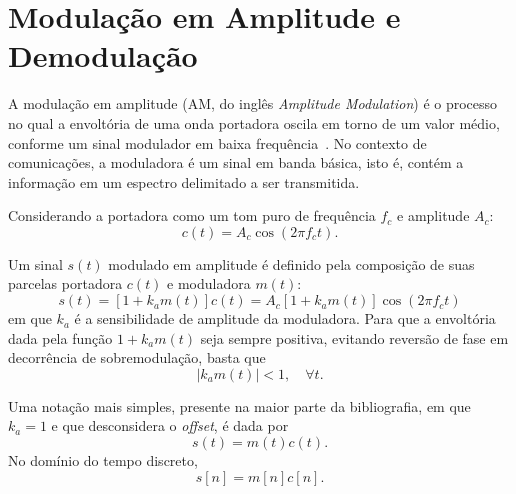\section{Modulação em Amplitude e Demodulação}
A modulação em amplitude (AM, do inglês \textit{Amplitude Modulation}) é o
processo no qual a envoltória de uma onda portadora oscila em torno de um valor
médio, conforme um sinal modulador em baixa frequência~\cite{haykin2008}. No
contexto de comunicações, a moduladora é um sinal em banda básica, isto é,
contém a informação em um espectro delimitado a ser transmitida.

Considerando a portadora como um tom puro de frequência $f_c$ e amplitude $A_c$:
\begin{equation}
    c(t) = A_c \cos(2\pi f_c t).
\end{equation}

    Um sinal $s(t)$ modulado em amplitude é definido pela composição de
suas parcelas portadora $c(t)$ e moduladora $m(t)$:
\begin{equation}
    s(t) = [1+k_a m(t)]c(t) = A_c[1+k_a m(t)]\cos(2\pi f_c t)
\end{equation}
em que $k_a$ é a sensibilidade de amplitude da moduladora. Para que a envoltória
dada pela função $1+k_a m(t)$ seja sempre positiva, evitando reversão de fase
em decorrência de sobremodulação, basta que
\begin{equation}
    |k_a m(t)| < 1, \quad \forall t.
\end{equation}

Uma notação mais simples, presente na maior parte da
bibliografia, em que $k_a = 1$ e que desconsidera o
\textit{offset}, é dada por
\begin{equation}
    s(t) = m(t)c(t).
\end{equation}
No domínio do tempo discreto,
\begin{equation}
    s[n] = m[n]c[n]. 
\end{equation}
